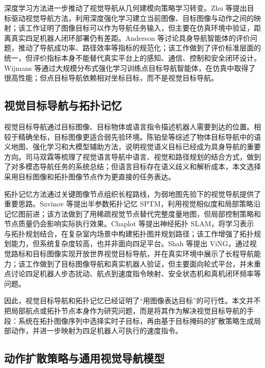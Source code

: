 深度学习方法进一步推动了视觉导航从几何建模向策略学习转变。Zhu 等\cite{zhu2017targetdriven}提出目标驱动视觉导航方法，利用深度强化学习建立当前图像、目标图像与动作之间的映射；该工作证明了图像目标可以作为导航任务输入，但主要在仿真环境中验证，距离真实四足机器人闭环部署仍有差距。Anderson 等\cite{anderson2018evaluation}讨论具身导航智能体的评价问题，推动了导航成功率、路径效率等指标的规范化；该工作做到了评价标准层面的统一，但评价指标本身不能替代真实平台上的感知、通信、控制和安全闭环设计。Wijmans 等\cite{ddppo2020}通过大规模分布式强化学习训练点目标导航智能体，在仿真中取得了很高性能；但点目标导航依赖相对坐标目标，而不是视觉目标导航。

\subsection{视觉目标导航与拓扑记忆}

视觉目标导航通过目标图像、目标物体或语言指令描述机器人需要到达的位置。相较于精确坐标，目标图像更适合弱先验环境。陈铂垒等\cite{chen2025object_nav_review}综述了物体目标导航中的语义地图、强化学习和大模型辅助方法，说明视觉语义目标已经成为具身导航的重要方向。司马双霖等\cite{sima2023vln_review}梳理了视觉语言导航中语言、视觉和路径规划的结合方式，做到了对多模态导航任务的系统总结；但语言目标存在语义歧义和解析成本，本文选择采用目标图像和拓扑图像节点作为更直接的任务表达。

拓扑记忆方法通过关键图像节点组织长程路线，为弱地图先验下的视觉导航提供了重要思路。Savinov 等\cite{savinov2018sptm}提出半参数拓扑记忆 SPTM，利用视觉相似度和局部策略沿记忆图前进；该方法做到了用稀疏视觉节点替代完整度量地图，但局部控制策略和节点质量仍会影响实际执行效果。Chaplot 等\cite{chaplot2020nts}提出神经拓扑 SLAM，将学习表示与拓扑规划结合，在复杂室内场景中构建拓扑图并规划路径；该工作增强了拓扑规划能力，但系统复杂度较高，也并非面向四足平台。Shah 等\cite{shah2021ving}提出 ViNG，通过视觉路标和目标图像实现开放世界视觉目标导航，并在真实环境中展示了长程导航能力；该工作做到了目标图像导航和真实机器人验证，但主要面向轮式平台，并未重点讨论四足机器人步态扰动、航点到速度指令映射、安全状态机和真机闭环频率等问题。

因此，视觉目标导航和拓扑记忆已经证明了“用图像表达目标”的可行性。本文并不把局部航点或拓扑节点本身作为研究问题，而是将其作为解决视觉目标导航的手段：系统在拓扑图像序列中选择实时子目标，再由基于目标掩码的扩散策略生成局部动作，并进一步映射为四足机器人可执行的速度指令。

\subsection{动作扩散策略与通用视觉导航模型}

